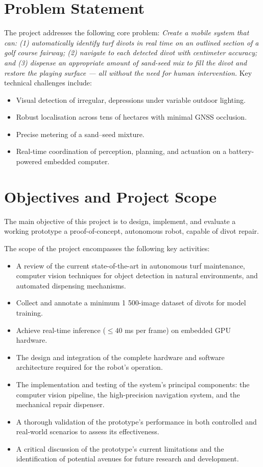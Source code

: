 \section{Problem Statement}
The project addresses the following core problem: \emph{Create a mobile system that can: (1) automatically identify turf divots in real time on an outlined section of a golf course fairway; (2) navigate to each detected divot with centimeter accuracy; and (3) dispense an appropriate amount of sand-seed mix to fill the divot and restore the playing surface — all without the need for human intervention.}
Key technical challenges include:
\begin{itemize}
  \item Visual detection of irregular, depressions under variable outdoor lighting.
  \item Robust localisation across tens of hectares with minimal GNSS occlusion.
  \item Precise metering of a sand–seed mixture.
  \item Real-time coordination of perception, planning, and actuation on a battery-powered embedded computer.
\end{itemize}


\section{Objectives and Project Scope}
\label{sec:objectives_scope}
The main objective of this project is to design, implement, and evaluate a working prototype a proof-of-concept, autonomous robot, capable of divot repair.

The scope of the project encompasses the following key activities:
\begin{itemize}
    \item A review of the current state-of-the-art in autonomous turf maintenance, computer vision techniques for object detection in natural environments, and automated dispensing mechanisms.
    \item Collect and annotate a minimum 1 500-image dataset of divots for model training.
    \item Achieve real-time inference ($\le\!40$ ms per frame) on embedded GPU hardware.
    \item The design and integration of the complete hardware and software architecture required for the robot's operation.
    \item The implementation and testing of the system's principal components: the computer vision pipeline, the high-precision navigation system, and the mechanical repair dispenser.
    \item A thorough validation of the prototype's performance in both controlled and real-world scenarios to assess its effectiveness.
    \item A critical discussion of the prototype's current limitations and the identification of potential avenues for future research and development.
\end{itemize}

